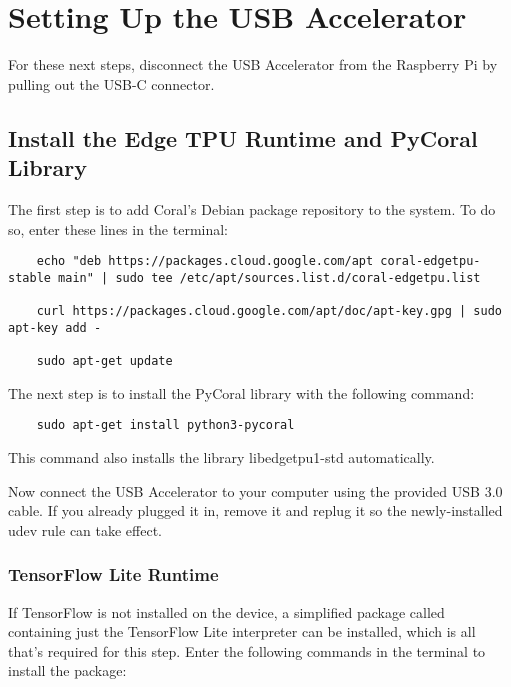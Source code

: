 %
%

\chapter{Setting Up the USB Accelerator}
\label{chap:Setup}

For these next steps, disconnect the USB Accelerator from the Raspberry Pi by pulling out the USB-C connector.

\section{Install the Edge TPU Runtime and PyCoral Library}

The first step is to add Coral's Debian package repository to the system. To do so, enter these lines in the terminal:



\begin{verbatim}
	echo "deb https://packages.cloud.google.com/apt coral-edgetpu-stable main" | sudo tee /etc/apt/sources.list.d/coral-edgetpu.list
	
	curl https://packages.cloud.google.com/apt/doc/apt-key.gpg | sudo apt-key add -
	
	sudo apt-get update
\end{verbatim}


The next step is to install the PyCoral library with the following command:

\begin{verbatim}
	sudo apt-get install python3-pycoral
\end{verbatim}

\begin{notes}
	\item This command also installs the library libedgetpu1-std automatically.
\end{notes}


 Now connect the USB Accelerator to your computer using the provided USB 3.0 cable. If you already plugged it in, remove it and replug it so the newly-installed udev rule can take effect.

\subsection{TensorFlow Lite Runtime}

If TensorFlow is not installed on the device, a simplified package called  containing just the TensorFlow Lite interpreter can be installed, which is all that's required for this step. Enter the following commands in the terminal to install the package:

